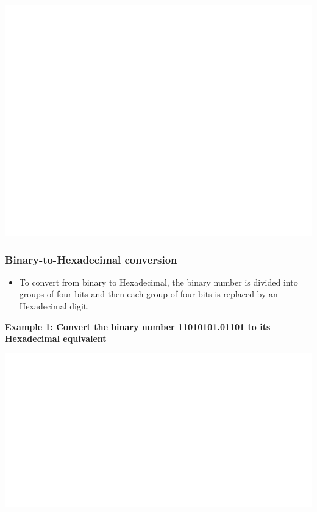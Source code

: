 \documentclass[]{book}
\providecommand{\tightlist}{%
  \setlength{\itemsep}{0pt}\setlength{\parskip}{0pt}}
\begin{document}
\begin{center}\includegraphics[width=1\linewidth]{figure/NSbox18-1} \end{center}

\hypertarget{binary-to-hexadecimal-conversion}{%
\subsubsection{Binary-to-Hexadecimal conversion}\label{binary-to-hexadecimal-conversion}}

\begin{itemize}
\tightlist
\item
  To convert from binary to Hexadecimal, the binary number is divided into groups of four bits and then each group of four bits is replaced by an Hexadecimal digit.
\end{itemize}

\textbf{Example 1: Convert the binary number 11010101.01101 to its Hexadecimal equivalent}

\begin{center}\includegraphics[width=1\linewidth]{figure/NSbox19-1} \end{center}
\end{document}
